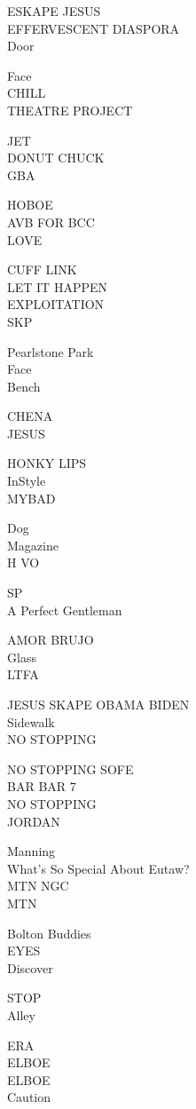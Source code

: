 \documentclass[10pt,letterpaper]{article}
\begin{document}
ESKAPE JESUS\\
EFFERVESCENT DIASPORA\\
Door

Face\\
CHILL\\
THEATRE PROJECT

JET\\
DONUT CHUCK\\
GBA

HOBOE\\
AVB FOR BCC\\
LOVE

CUFF LINK\\
LET IT HAPPEN\\
EXPLOITATION\\
SKP

Pearlstone Park\\
Face\\
Bench

CHENA\\
JESUS

HONKY LIPS\\
InStyle\\
MYBAD

Dog\\
Magazine\\
H VO

SP\\
A Perfect Gentleman

AMOR BRUJO\\
Glass\\
LTFA

JESUS SKAPE OBAMA BIDEN\\
Sidewalk\\
NO STOPPING

NO STOPPING SOFE\\
BAR BAR 7\\
NO STOPPING\\
JORDAN

Manning\\
What's So Special About Eutaw?\\
MTN NGC\\
MTN

Bolton Buddies\\
EYES\\
Discover

STOP\\
Alley

ERA\\
ELBOE\\
ELBOE\\
Caution
\end{document}
